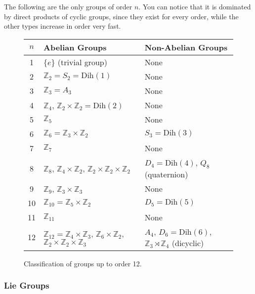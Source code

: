 \documentclass{article}
\begin{document}
  \begin{theorem}
    The following are the only groups of order $n$. You can notice that it is dominated by direct products of cyclic groups, since they exist for every order, while the other types increase in order very fast.   

    \begin{figure}[H]
      \centering
      \begin{tabular}{|c|l|l|}
      \hline
      $n$ & \textbf{Abelian Groups} & \textbf{Non-Abelian Groups} \\
      \hline
      1 & $\{e\}$ (trivial group) & None \\
      \hline
      2 & $\mathbb{Z}_2 = S_2 = \text{Dih}(1)$ & None \\
      \hline
      3 & $\mathbb{Z}_3 = A_3$ & None \\
      \hline
      4 & $\mathbb{Z}_4$, $\mathbb{Z}_2 \times \mathbb{Z}_2 = \text{Dih}(2)$ & None \\
      \hline
      5 & $\mathbb{Z}_5$ & None \\
      \hline
      6 & $\mathbb{Z}_6 = \mathbb{Z}_3 \times \mathbb{Z}_2$ & $S_3 = \text{Dih}(3)$ \\
      \hline
      7 & $\mathbb{Z}_7$ & None \\
      \hline
      8 & $\mathbb{Z}_8$, $\mathbb{Z}_4 \times \mathbb{Z}_2$, $\mathbb{Z}_2 \times \mathbb{Z}_2 \times \mathbb{Z}_2$ & $D_4 = \text{Dih}(4)$, $Q_8$ (quaternion) \\
      \hline
      9 & $\mathbb{Z}_9$, $\mathbb{Z}_3 \times \mathbb{Z}_3$ & None \\
      \hline
      10 & $\mathbb{Z}_{10} = \mathbb{Z}_5 \times \mathbb{Z}_2$ & $D_5 = \text{Dih}(5)$ \\
      \hline
      11 & $\mathbb{Z}_{11}$ & None \\
      \hline
      12 & $\mathbb{Z}_{12} = \mathbb{Z}_4 \times \mathbb{Z}_3$, $\mathbb{Z}_6 \times \mathbb{Z}_2$, $\mathbb{Z}_2 \times \mathbb{Z}_2 \times \mathbb{Z}_3$ & $A_4$, $D_6 = \text{Dih}(6)$, $\mathbb{Z}_3 \rtimes \mathbb{Z}_4$ (dicyclic) \\
      \hline
      \end{tabular}
      \caption{Classification of groups up to order 12.}
      \label{tab:groups_up_to_order_10}
    \end{figure}
  \end{theorem}

\subsubsection{Lie Groups} 
\end{document}
